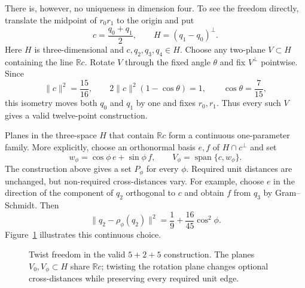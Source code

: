 \documentclass[11pt]{article}
\begin{document}
There is, however, no uniqueness in dimension four.  To see the freedom
directly, translate the midpoint of $r_0r_1$ to the origin and put
\[
 c=\frac{q_0+q_1}{2},
 \qquad
 H=(q_1-q_0)^\perp.
\]
Here $H$ is three-dimensional and $c,q_2,q_3,q_4\in H$.  Choose any
two-plane $V\subset H$ containing the line $\mathbb Rc$.  Rotate $V$ through
the fixed angle $\theta$ and fix $V^\perp$ pointwise.  Since
\[
 \lVert c\rVert^2=\frac{15}{16},
 \qquad
 2\lVert c\rVert^2(1-\cos\theta)=1,
 \qquad
 \cos\theta=\frac7{15},
\]
this isometry moves both $q_0$ and $q_1$ by one and fixes $r_0,r_1$.  Thus
every such $V$ gives a valid twelve-point construction.

Planes in the three-space $H$ that contain $\mathbb Rc$ form a continuous
one-parameter family.  More explicitly, choose an orthonormal basis $e,f$ of
$H\cap c^\perp$ and set
\[
 w_\phi=\cos\phi\,e+\sin\phi\,f,
 \qquad
 V_\phi=\operatorname{span}\{c,w_\phi\}.
\]
The construction above gives a set $P_\phi$ for every $\phi$.  Required unit
distances are unchanged, but non-required cross-distances vary.  For example,
choose $e$ in the direction of the component of $q_2$ orthogonal to $c$ and
obtain $f$ from $q_3$ by Gram--Schmidt.  Then
\begin{equation}
 \lVert q_2-\rho_\phi(q_2)\rVert^2
 =\frac19+\frac{16}{45}\cos^2\phi.
 \label{eq:varying-cross-distance}
\end{equation}
Figure~\ref{fig:twist-family} illustrates this continuous choice.

\begin{figure}[!htbp]
\centering
{}
\caption{Twist freedom in the valid $5+2+5$ construction.  The planes
$V_0,V_\phi\subset H$ share $\mathbb Rc$; twisting the rotation plane changes
optional cross-distances while preserving every required unit edge.}
\label{fig:twist-family}
\end{figure}
\end{document}
